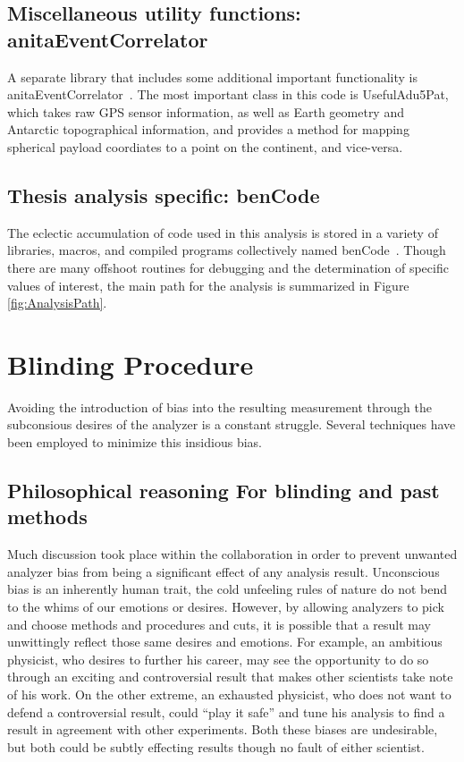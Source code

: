 	\subsection{Miscellaneous utility functions: anitaEventCorrelator}
		A separate library that includes some additional important functionality is anitaEventCorrelator~\cite{anitaEventCorrelator}.  The most important class in this code is UsefulAdu5Pat, which takes raw GPS sensor information, as well as Earth geometry and Antarctic topographical information, and provides a method for mapping spherical payload coordiates to a point on the continent, and vice-versa.
		
		
	\subsection{Thesis analysis specific: benCode}
		The eclectic accumulation of code used in this analysis is stored in a variety of libraries, macros, and compiled programs collectively named benCode~\cite{benCode}.  Though there are many offshoot routines for debugging and the determination of specific values of interest, the main path for the analysis is summarized in Figure \ref{fig:AnalysisPath}.

	
	
	
\section{Blinding Procedure}
	Avoiding the introduction of bias into the resulting measurement through the subconsious desires of the analyzer is a constant struggle.  Several techniques have been employed to minimize this insidious bias.
	
	\subsection{Philosophical reasoning For blinding and past methods}
		Much discussion took place within the collaboration in order to prevent unwanted analyzer bias from being a significant effect of any analysis result.  Unconscious bias is an inherently human trait, the cold unfeeling rules of nature do not bend to the whims of our emotions or desires.  However, by allowing analyzers to pick and choose methods and procedures and cuts, it is possible that a result may unwittingly reflect those same desires and emotions.  For example, an ambitious physicist, who desires to further his career, may see the opportunity to do so through an exciting and controversial result that makes other scientists take note of his work.  On the other extreme, an exhausted physicist, who does not want to defend a controversial result, could ``play it safe'' and tune his analysis to find a result in agreement with other experiments.  Both these biases are undesirable, but both could be subtly effecting results though no fault of either scientist.
		
